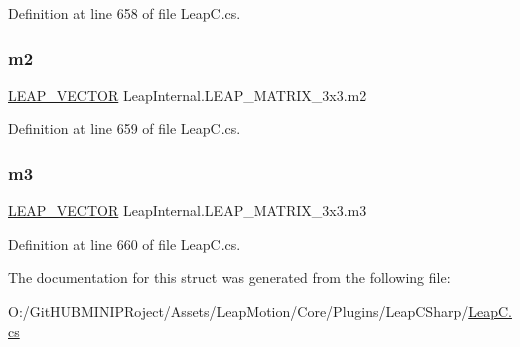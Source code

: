 Definition at line 658 of file Leap\+C.\+cs.

\mbox{\label{struct_leap_internal_1_1_l_e_a_p___m_a_t_r_i_x__3x3_aeb1c5fba446c394910f6a98902a92928}} 
\subsubsection{\texorpdfstring{m2}{m2}}
{\footnotesize\ttfamily \mbox{\hyperlink{struct_leap_internal_1_1_l_e_a_p___v_e_c_t_o_r}{L\+E\+A\+P\+\_\+\+V\+E\+C\+T\+OR}} Leap\+Internal.\+L\+E\+A\+P\+\_\+\+M\+A\+T\+R\+I\+X\+\_\+3x3.\+m2}



Definition at line 659 of file Leap\+C.\+cs.

\mbox{\label{struct_leap_internal_1_1_l_e_a_p___m_a_t_r_i_x__3x3_a17a3e55f68ec73e234be358a7c2c0af8}} 
\subsubsection{\texorpdfstring{m3}{m3}}
{\footnotesize\ttfamily \mbox{\hyperlink{struct_leap_internal_1_1_l_e_a_p___v_e_c_t_o_r}{L\+E\+A\+P\+\_\+\+V\+E\+C\+T\+OR}} Leap\+Internal.\+L\+E\+A\+P\+\_\+\+M\+A\+T\+R\+I\+X\+\_\+3x3.\+m3}



Definition at line 660 of file Leap\+C.\+cs.



The documentation for this struct was generated from the following file\+:\begin{DoxyCompactItemize}
\item 
O\+:/\+Git\+H\+U\+B\+M\+I\+N\+I\+P\+Roject/\+Assets/\+Leap\+Motion/\+Core/\+Plugins/\+Leap\+C\+Sharp/\mbox{\hyperlink{_leap_c_8cs}{Leap\+C.\+cs}}\end{DoxyCompactItemize}
